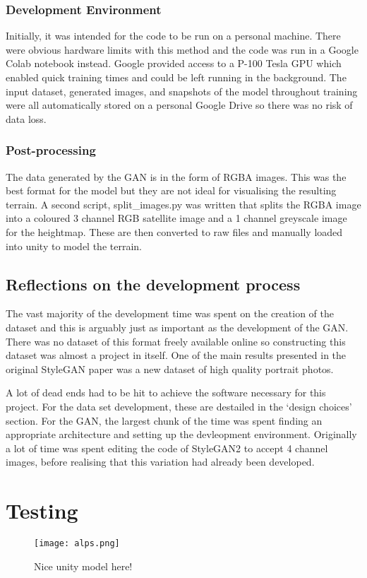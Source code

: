 \documentclass[a4paper]{report}
\begin{document}
\subsubsection{Development Environment}
Initially, it was intended for the code to be run on a personal machine. There were obvious hardware limits with this method and the code was run in a Google Colab notebook instead. Google provided access to a P-100 Tesla GPU which enabled quick training times and could be left running in the background. The input dataset, generated images, and snapshots of the model throughout training were all automatically stored on a personal Google Drive so there was no risk of data loss.

\subsubsection{Post-processing}
The data generated by the GAN is in the form of RGBA images. This was the best format for the model but they are not ideal for visualising the resulting terrain. A second script, split\_images.py was written that splits the RGBA image into a coloured 3 channel RGB satellite image and a 1 channel greyscale image for the heightmap. These are then converted to raw files and manually loaded into unity to model the terrain.
\subsection{Reflections on the development process}
The vast majority of the development time was spent on the creation of the dataset and this is arguably just as important as the development of the GAN. There was no dataset of this format freely available online so constructing this dataset was almost a project in itself. One of the main results presented in the original StyleGAN paper \cite{ToDo} was a new dataset of high quality portrait photos.

A lot of dead ends had to be hit to achieve the software necessary for this project. For the data set development, these are destailed in the `design choices' section. For the GAN, the largest chunk of the time was spent finding an appropriate architecture and setting up the devleopment environment. Originally a lot of time was spent editing the code of StyleGAN2 to accept 4 channel images, before realising that this variation had already been developed.
\section{Testing}
\begin{figure}[H]
    \centering
        \texttt{[image: alps.png]}
        \caption{Nice unity model here!}
        \label{fig:ToDo}
\end{figure}
\end{document}
